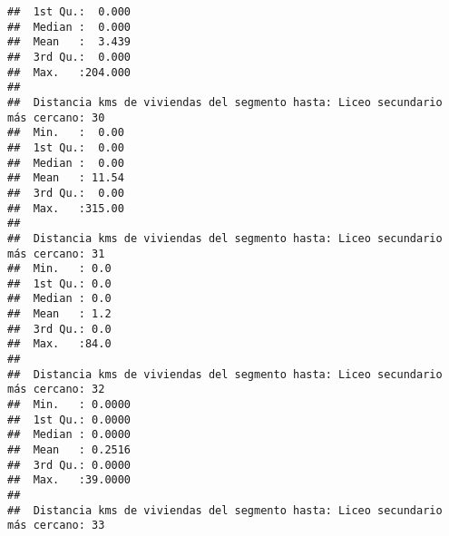 \documentclass[11pt,]{article}
\begin{document}
\begin{verbatim}
##  1st Qu.:  0.000                                                                
##  Median :  0.000                                                                
##  Mean   :  3.439                                                                
##  3rd Qu.:  0.000                                                                
##  Max.   :204.000                                                                
##                                                                                 
##  Distancia kms de viviendas del segmento hasta: Liceo secundario más cercano: 30
##  Min.   :  0.00                                                                 
##  1st Qu.:  0.00                                                                 
##  Median :  0.00                                                                 
##  Mean   : 11.54                                                                 
##  3rd Qu.:  0.00                                                                 
##  Max.   :315.00                                                                 
##                                                                                 
##  Distancia kms de viviendas del segmento hasta: Liceo secundario más cercano: 31
##  Min.   : 0.0                                                                   
##  1st Qu.: 0.0                                                                   
##  Median : 0.0                                                                   
##  Mean   : 1.2                                                                   
##  3rd Qu.: 0.0                                                                   
##  Max.   :84.0                                                                   
##                                                                                 
##  Distancia kms de viviendas del segmento hasta: Liceo secundario más cercano: 32
##  Min.   : 0.0000                                                                
##  1st Qu.: 0.0000                                                                
##  Median : 0.0000                                                                
##  Mean   : 0.2516                                                                
##  3rd Qu.: 0.0000                                                                
##  Max.   :39.0000                                                                
##                                                                                 
##  Distancia kms de viviendas del segmento hasta: Liceo secundario más cercano: 33

\end{verbatim}
\end{document}
